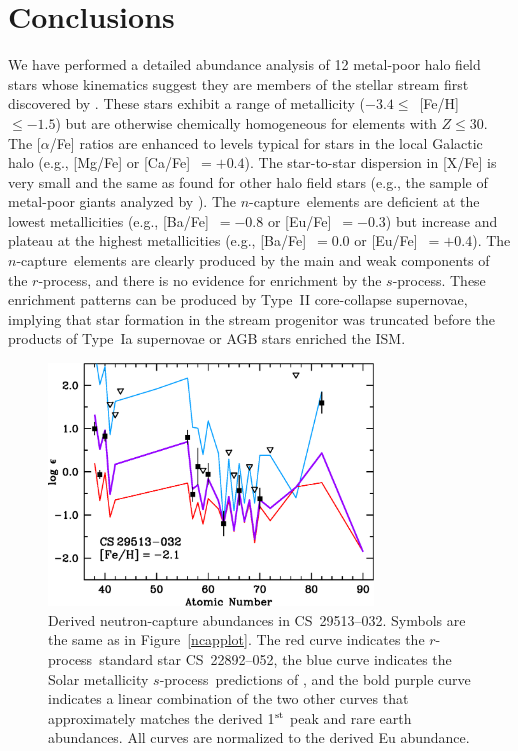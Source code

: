 \documentclass{emulateapj}
\def\rpro{\mbox{$r$-process}}
\def\spro{\mbox{$s$-process}}
\def\ncap{\mbox{$n$-capture}}
\begin{document}
\section{Conclusions}
\label{conclusions}


We have performed a detailed abundance analysis of 12 metal-poor 
halo field stars whose kinematics suggest they are
members of the stellar stream first discovered by \citet{helmi99b}.
These stars exhibit a range of metallicity
($-3.4 \leq$~[Fe/H]~$\leq -1.5$)
but are otherwise chemically homogeneous for elements with $Z \leq 30$.
The [$\alpha$/Fe] ratios are enhanced to levels typical for 
stars in the local Galactic halo
(e.g., [Mg/Fe] or [Ca/Fe]~$= +0.4$).
The star-to-star dispersion in [X/Fe] is very small and the
same as found for other halo field stars
(e.g., the sample of metal-poor giants analyzed by \citealt{cayrel04}).
The \ncap\ elements are deficient 
at the lowest metallicities
(e.g., [Ba/Fe]~$= -0.8$ or [Eu/Fe]~$= -0.3$) 
but increase and plateau at the highest metallicities
(e.g., [Ba/Fe]~$= 0.0$ or [Eu/Fe]~$= +0.4$).
The \ncap\ elements are clearly produced by the 
main and weak components of the \rpro, and there is no evidence
for enrichment by the \spro.
These enrichment patterns can be produced by Type~II core-collapse
supernovae, implying that star formation in the stream progenitor
was truncated before the products of Type~Ia supernovae or AGB 
stars enriched the ISM.

\begin{figure}
\includegraphics[angle=0,width=3.4in]{fig18.eps}
\caption{ 
\label{cs29513m032}
Derived neutron-capture abundances in \mbox{CS~29513--032}.
Symbols are the same as in Figure~\ref{ncapplot}.
The red curve indicates the \rpro\ standard star \mbox{CS~22892--052},
the blue curve indicates the Solar metallicity \spro\ predictions
of \citet{arlandini99}, and
the bold purple curve indicates a linear combination of the two
other curves that approximately matches the derived 
1$^{\rm st}$ peak and rare earth abundances. 
All curves are normalized to the derived Eu abundance.
}
\end{figure}
\end{document}

